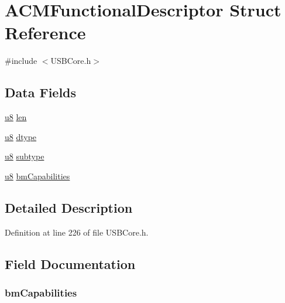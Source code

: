 \hypertarget{struct_a_c_m_functional_descriptor}{}\section{A\+C\+M\+Functional\+Descriptor Struct Reference}
\label{struct_a_c_m_functional_descriptor}


{\ttfamily \#include $<$U\+S\+B\+Core.\+h$>$}

\subsection*{Data Fields}
\begin{DoxyCompactItemize}
\item 
\hyperlink{_u_s_b_a_p_i_8h_aed742c436da53c1080638ce6ef7d13de}{u8} \hyperlink{struct_a_c_m_functional_descriptor_afbf3f3230446569534d5f466aaf4c23b}{len}
\item 
\hyperlink{_u_s_b_a_p_i_8h_aed742c436da53c1080638ce6ef7d13de}{u8} \hyperlink{struct_a_c_m_functional_descriptor_a0bb419531ec75697e63e9109fecf81b0}{dtype}
\item 
\hyperlink{_u_s_b_a_p_i_8h_aed742c436da53c1080638ce6ef7d13de}{u8} \hyperlink{struct_a_c_m_functional_descriptor_afb82dd1313bc5284e4e5aef8218ef414}{subtype}
\item 
\hyperlink{_u_s_b_a_p_i_8h_aed742c436da53c1080638ce6ef7d13de}{u8} \hyperlink{struct_a_c_m_functional_descriptor_a9ad7ca27543639baeed1b53c6f24e149}{bm\+Capabilities}
\end{DoxyCompactItemize}


\subsection{Detailed Description}


Definition at line 226 of file U\+S\+B\+Core.\+h.



\subsection{Field Documentation}
\hypertarget{struct_a_c_m_functional_descriptor_a9ad7ca27543639baeed1b53c6f24e149}{}
\subsubsection[{bm\+Capabilities}]{ bm\+Capabilities}\label{struct_a_c_m_functional_descriptor_a9ad7ca27543639baeed1b53c6f24e149}


